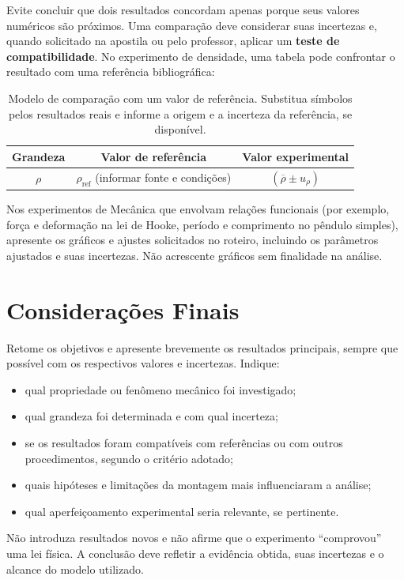 \documentclass[aps,prb,12pt,onecolumn,amsmath,amssymb]{revtex4-2}
\begin{document}
Evite concluir que dois resultados concordam apenas porque seus valores numéricos são próximos. Uma comparação deve considerar suas incertezas e, quando solicitado na apostila ou pelo professor, aplicar um \textbf{teste de compatibilidade}. No experimento de densidade, uma tabela pode confrontar o resultado com uma referência bibliográfica:
\begin{table}[ht]
    \centering
    \begin{tabular}{ccc}
        \toprule
        Grandeza & Valor de referência & Valor experimental \\
        \midrule
        $\rho$ & $\rho_{\mathrm{ref}}$ (informar fonte e condições) & $(\overline{\rho}\pm u_\rho)$ \\
        \bottomrule
    \end{tabular}
    \caption{Modelo de comparação com um valor de referência. Substitua símbolos pelos resultados reais e informe a origem e a incerteza da referência, se disponível.}
    \label{tab:comparacao}
\end{table}

Nos experimentos de Mecânica que envolvam relações funcionais (por exemplo, força e deformação na lei de Hooke, período e comprimento no pêndulo simples), apresente os gráficos e ajustes solicitados no roteiro, incluindo os parâmetros ajustados e suas incertezas. Não acrescente gráficos sem finalidade na análise.

\section{Considerações Finais}
Retome os objetivos e apresente brevemente os resultados principais, sempre que possível com os respectivos valores e incertezas. Indique:
\begin{itemize}
    \item qual propriedade ou fenômeno mecânico foi investigado;
    \item qual grandeza foi determinada e com qual incerteza;
    \item se os resultados foram compatíveis com referências ou com outros procedimentos, segundo o critério adotado;
    \item quais hipóteses e limitações da montagem mais influenciaram a análise;
    \item qual aperfeiçoamento experimental seria relevante, se pertinente.
\end{itemize}
Não introduza resultados novos e não afirme que o experimento ``comprovou'' uma lei física. A conclusão deve refletir a evidência obtida, suas incertezas e o alcance do modelo utilizado.
\end{document}
